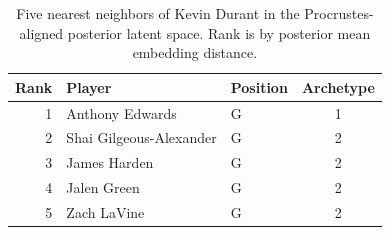 \begin{table}[htbp]
  \centering\small
  \begin{tabular}{rllc}
    \toprule
    Rank & Player & Position & Archetype \\
    \midrule
    1 & Anthony Edwards & G & 1 \\
    2 & Shai Gilgeous-Alexander & G & 2 \\
    3 & James Harden & G & 2 \\
    4 & Jalen Green & G & 2 \\
    5 & Zach LaVine & G & 2 \\
    \bottomrule
  \end{tabular}
  \caption{Five nearest neighbors of Kevin Durant in the Procrustes-aligned posterior latent space. Rank is by posterior mean embedding distance.}
  \label{tab:Kevin_Durant_neighbors}
\end{table}


